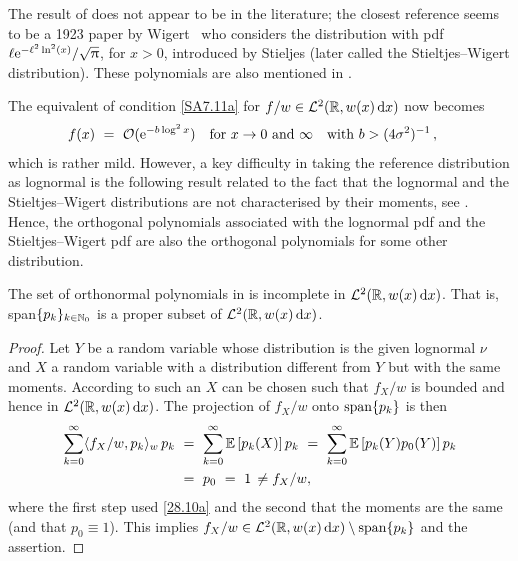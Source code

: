 \begin{remark}\label{Rem:27.10b}
The result of 
does not appear to be in the literature; the closest reference
seems to be a 1923 paper by Wigert~\cite{Wi23} who considers
the distribution with pdf
$\ell\mathrm{e}^{-\ell^{2}\ln^{2}(x)}/\sqrt{\uppi}$, for $x>0$, introduced by Stieljes \cite[pp.\ 507--508]{St1894} (later called the Stieltjes--Wigert distribution). These polynomials are also mentioned in \cite[pp.\ 172--175]{Ch11}.
\remQED \end{remark}

The equivalent of condition \eqref{SA7.11a} for $f/w\in\mathcal{L}^2(\mathbb{R}, w(x) \mathop{}\!\mathrm{d} x)$ now becomes
\begin{align}\label{SA7.11c}
f(x)\ &=\ {\mathcal{O}}(\mathrm{e}^{ -b \log^2x } )\quad\text{for }x\to 0 \text{ and } \infty \quad\text{with } b> (4\sigma^2)^{-1}\,,
\end{align}
which is rather mild. However,
a key difficulty in taking the reference distribution as lognormal is the following
result related to the fact that the lognormal and the Stieltjes--Wigert distributions are not characterised by their moments, see \cite{Heyde63,Berg1984,Ch79,Ch03}. Hence, the orthogonal polynomials associated with the lognormal pdf and the Stieltjes--Wigert pdf are also the orthogonal polynomials for some other distribution.
\begin{proposition} \label{prop:ln_incomplete} The set of orthonormal polynomials in
 is incomplete
in $\mathcal{L}^2(\mathbb{R}, w(x) \mathop{}\!\mathrm{d} x)$. That is, {\rm span}$\{p_k\}_{k \in \mathbb{N}_0}$ is a proper subset of $\mathcal{L}^2(\mathbb{R}, w(x) \mathop{}\!\mathrm{d} x)$.
\end{proposition}
\begin{proof} Let $Y$ be a random variable whose distribution is the given lognormal $\nu$
and $X$ a random variable with a distribution different from $Y$
but with the same moments. According to \cite[pp.\ 201--202]{Berg1984} such an $X$ can be
chosen such that $f_X/w$ is bounded and hence in $\mathcal{L}^2(\mathbb{R}, w(x) \mathop{}\!\mathrm{d} x)$. The projection of
$f_X/w$  onto ${\rm span}\{p_k\}$ is then
\begin{align*}\sum_{k=0}^\infty \langle f_X/w, p_k \rangle_w \, p_k\ &=\
\sum_{k=0}^\infty \operatorname{{\mathbb E}}\left[p_k(X)\right]p_k\ =\ \sum_{k=0}^\infty \operatorname{{\mathbb E}}\left[p_k(Y) p_0(Y) \right]p_k\\
&=\ p_0\ =\ 1\,\neq f_X/w,
\end{align*}
where the first step used \eqref{28.10a} and the second that the moments are the same (and that $p_0 \equiv 1$).
This implies $f_X/w\in\mathcal{L}^2(\mathbb{R}, w(x) \mathop{}\!\mathrm{d} x)\setminus{\rm span}\{p_k\}$ and the assertion.
\end{proof}
%


